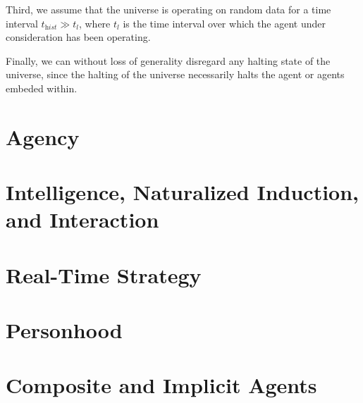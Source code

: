 \documentclass[12pt]{article}
\begin{document}
Third, we assume that the universe is operating on random data for a time
interval \(t_\textit{hist} \gg t_l\), where \(t_l\) is the time interval over
which the agent under consideration has been operating.

Finally, we can without loss of generality disregard any halting state of the
universe, since the halting of the universe necessarily halts the agent or
agents embeded within.

\section{Agency}
\label{sec:agents}


\section{Intelligence, Naturalized Induction, and Interaction}
\label{sec:intelligence}


\section{Real-Time Strategy}
\label{sec:games}


\section{Personhood}
\label{sec:persons}


\section{Composite and Implicit Agents}
\label{sec:composites}




\end{document}
